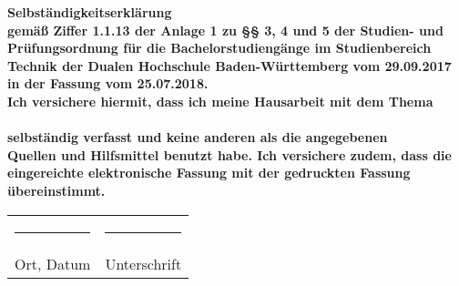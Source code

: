 \newpage
\thispagestyle{empty}
\begin{center}
	\vspace*{2cm}
	\Huge\bf Selbständigkeitserklärung\\
	\vspace*{3cm}
	\normalsize\rm
	gemäß Ziffer 1.1.13 der Anlage 1 zu §§ 3, 4 und 5  der Studien- und Prüfungsordnung für die Bachelorstudiengänge im Studienbereich Technik der Dualen Hochschule Baden-Württemberg vom 29.09.2017 in der Fassung vom 25.07.2018.\\
	Ich versichere hiermit, dass ich meine Hausarbeit mit dem Thema\\
	\vspace*{2cm}
	\Large\bf\myTopic\\
	\vspace*{2cm}
	\normalsize\rm
	selbständig verfasst und keine anderen als die angegebenen\\Quellen und Hilfsmittel benutzt habe. Ich versichere zudem, dass die eingereichte elektronische Fassung mit der gedruckten Fassung übereinstimmt.\\
	\vfill
	\begin{tabularx}{0.78\textwidth}{l@{\extracolsep\fill}l}
		\rule{4cm}{0.3mm}&\rule{4cm}{0.3mm}\\
	Ort, Datum&Unterschrift
	\end{tabularx}
\end{center}

\newpage